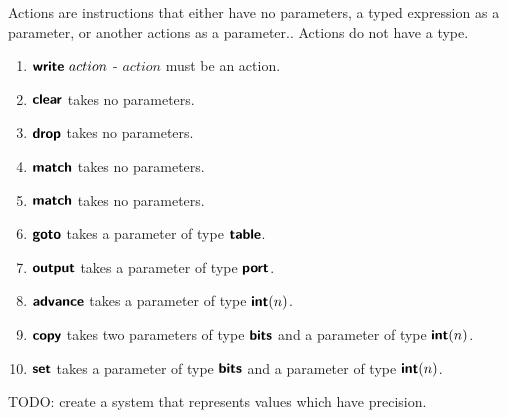 Actions are instructions that either have no parameters, a typed expression as a parameter, or another actions as a parameter.. Actions do not have a type.
\begin{enumerate}
  \item $\bm{\mathsf{{write}}} \ action$ - $action$ must be an action.
  \item $\bm{\mathsf{{clear}}}$ takes no parameters.
  \item $\bm{\mathsf{{drop}}}$ takes no parameters.
  \item $\bm{\mathsf{{match}}}$ takes no parameters.
  \item $\bm{\mathsf{{match}}}$ takes no parameters.
  \item $\bm{\mathsf{{goto}}}$ takes a parameter of type $\bm{\mathsf{{table}}}$.
  \item $\bm{\mathsf{{output}}}$ takes a parameter of type $\bm{\mathsf{{port}}}$.
  \item $\bm{\mathsf{{advance}}}$ takes a parameter of type $\bm{\mathsf{{int}}}(n)$.
  \item $\bm{\mathsf{{copy}}}$ takes two parameters of type $\bm{\mathsf{{bits}}}$ and a parameter of type $\bm{\mathsf{{int}}}(n)$.
  \item $\bm{\mathsf{{set}}}$ takes a parameter of type $\bm{\mathsf{{bits}}}$ and a parameter of type $\bm{\mathsf{{int}}}(n)$.
\end{enumerate}

TODO: create a system that represents values which have precision.
